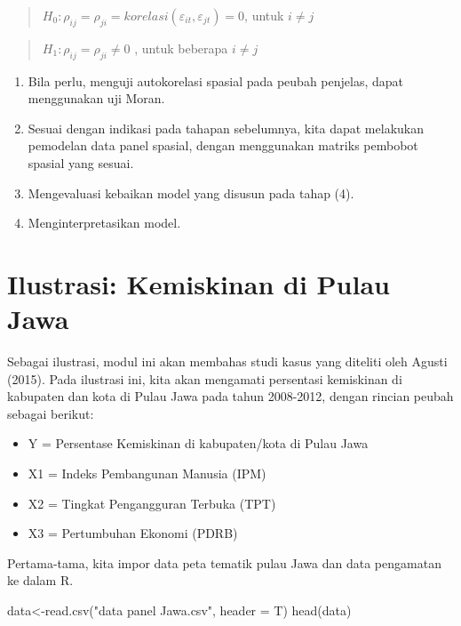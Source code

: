 \documentclass[
]{book}
\newenvironment{Shaded}{\begin{snugshade}}{\end{snugshade}}
\newcommand{\AttributeTok}[1]{\textcolor[rgb]{0.77,0.63,0.00}{#1}}
\newcommand{\FunctionTok}[1]{\textcolor[rgb]{0.00,0.00,0.00}{#1}}
\newcommand{\NormalTok}[1]{#1}
\newcommand{\OtherTok}[1]{\textcolor[rgb]{0.56,0.35,0.01}{#1}}
\newcommand{\StringTok}[1]{\textcolor[rgb]{0.31,0.60,0.02}{#1}}
\begin{document}
\begin{quote}
\(H_0: \rho_{ij}=\rho_{ji}= korelasi(\varepsilon_{it}, \varepsilon_{jt})=0\), untuk \(i \ne j\)
\end{quote}

\begin{quote}
\(H_1: \rho_{ij}=\rho_{ji} \ne 0\) , untuk beberapa \(i \ne j\)
\end{quote}

\begin{enumerate}
\def\labelenumi{(\arabic{enumi})}
\setcounter{enumi}{2}
\item
  Bila perlu, menguji autokorelasi spasial pada peubah penjelas, dapat menggunakan uji Moran.
\item
  Sesuai dengan indikasi pada tahapan sebelumnya, kita dapat melakukan pemodelan data panel spasial, dengan menggunakan matriks pembobot spasial yang sesuai.
\item
  Mengevaluasi kebaikan model yang disusun pada tahap (4).
\item
  Menginterpretasikan model.
\end{enumerate}

\hypertarget{ilustrasi-kemiskinan-di-pulau-jawa}{%
\section{Ilustrasi: Kemiskinan di Pulau Jawa}\label{ilustrasi-kemiskinan-di-pulau-jawa}}

Sebagai ilustrasi, modul ini akan membahas studi kasus yang diteliti oleh Agusti (2015). Pada ilustrasi ini, kita akan mengamati persentasi kemiskinan di kabupaten dan kota di Pulau Jawa pada tahun 2008-2012, dengan rincian peubah sebagai berikut:

\begin{itemize}
\item
  Y = Persentase Kemiskinan di kabupaten/kota di Pulau Jawa
\item
  X1 = Indeks Pembangunan Manusia (IPM)
\item
  X2 = Tingkat Pengangguran Terbuka (TPT)
\item
  X3 = Pertumbuhan Ekonomi (PDRB)
\end{itemize}

Pertama-tama, kita impor data peta tematik pulau Jawa dan data pengamatan ke dalam R.

\begin{Shaded}
\begin{Highlighting}[]
\NormalTok{data}\OtherTok{\textless{}{-}}\FunctionTok{read.csv}\NormalTok{(}\StringTok{"data panel Jawa.csv"}\NormalTok{, }\AttributeTok{header =}\NormalTok{ T)}
\FunctionTok{head}\NormalTok{(data)}
\end{Highlighting}
\end{Shaded}
\end{document}
